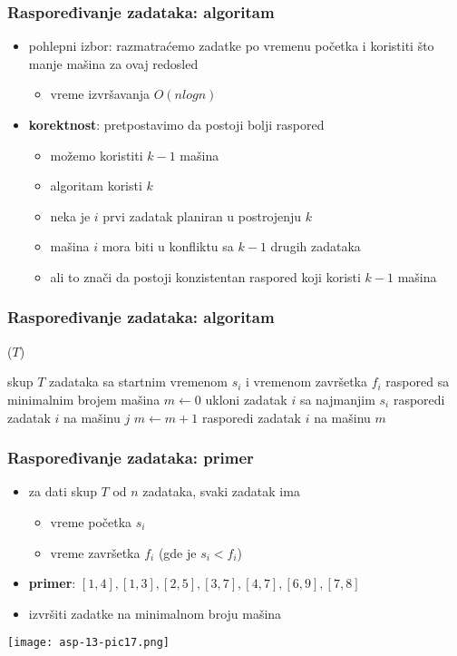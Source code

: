 \documentclass[compress,aspectratio=169]{beamer}
\begin{document}
\begin{frame}[fragile]
  \frametitle{Raspoređivanje zadataka: algoritam}
  \begin{itemize}
    \item pohlepni izbor: razmatraćemo zadatke po vremenu početka i
    koristiti što manje mašina za ovaj redosled
    \begin{itemize}
      \item vreme izvršavanja $O(n log n)$
    \end{itemize}
    \item \textbf{korektnost}: pretpostavimo da postoji bolji raspored
    \begin{itemize}
      \item možemo koristiti $k-1$ mašina
      \item algoritam koristi $k$
      \item neka je $i$ prvi zadatak planiran u postrojenju $k$
      \item mašina $i$ mora biti u konfliktu sa $k-1$ drugih zadataka
      \item ali to znači da postoji konzistentan raspored koji koristi
      $k-1$ mašina
    \end{itemize}
  \end{itemize}
\end{frame}

\begin{frame}
  \frametitle{Raspoređivanje zadataka: algoritam}
  ($T$)
  \begin{algorithmic}
    \REQUIRE skup $T$ zadataka sa startnim vremenom $s_{i}$ i vremenom završetka $f_{i}$
    \ENSURE raspored sa minimalnim brojem mašina
    \STATE $m \leftarrow 0$ 
      \STATE ukloni zadatak $i$ sa najmanjim $s_{i}$
        \STATE rasporedi zadatak $i$ na mašinu $j$
      \ELSE
        \STATE $m \leftarrow m+1$
        \STATE rasporedi zadatak $i$ na mašinu $m$
      \ENDIF
    \ENDWHILE
  \end{algorithmic}    
\end{frame}

\begin{frame}[fragile]
  \frametitle{Raspoređivanje zadataka: primer}
  \begin{itemize}
    \item za dati skup $T$ od $n$ zadataka, svaki zadatak ima
    \begin{itemize}
      \item vreme početka $s_{i}$
      \item vreme završetka $f_{i}$ (gde je $s_{i}<f_{i}$)
    \end{itemize}
    \item \textbf{primer}: $[1,4],[1,3],[2,5],[3,7],[4,7],[6,9],[7,8]$
    \item izvršiti zadatke na minimalnom broju mašina
  \end{itemize}
  \begin{center}
    \texttt{[image: asp-13-pic17.png]}
  \end{center}
\end{frame}
\end{document}
